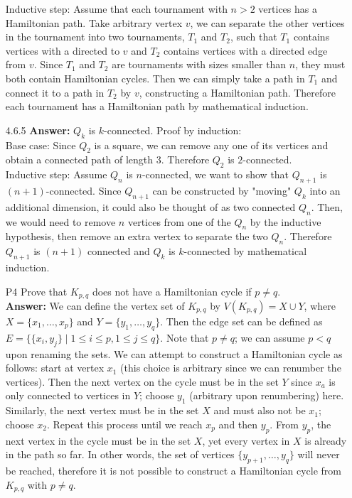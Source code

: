 \documentclass{article}
\begin{document}
\begin{itemize}
          Inductive step: Assume that each tournament with $n>2$ vertices has a Hamiltonian path. Take arbitrary vertex $v$, we can separate the other vertices in the tournament into two tournaments, $T_1$ and $T_2$, such that $T_1$ contains vertices with a directed to $v$ and $T_2$ contains vertices with a directed edge from $v$. Since $T_1$ and $T_2$ are tournaments with sizes smaller than $n$, they must both contain Hamiltonian cycles. Then we can simply take a path in $T_1$ and connect it to a path in $T_2$ by $v$, constructing a Hamiltonian path. Therefore each tournament has a Hamiltonian path by mathematical induction.
    \item [4.6.5] \textbf{Answer:} $Q_k$ is $k$-connected. Proof by induction:\\
          Base case: Since $Q_2$ is a square, we can remove any one of its vertices and obtain a connected path of length 3. Therefore $Q_2$ is $2$-connected.\\
          Inductive step: Assume $Q_n$ is $n$-connected, we want to show that $Q_{n+1}$ is $(n+1)$-connected. Since $Q_{n+1}$ can be constructed by "moving" $Q_k$ into an additional dimension, it could also be thought of as two connected $Q_n$. Then, we would need to remove $n$ vertices from one of the $Q_n$ by the inductive hypothesis, then remove an extra vertex to separate the two $Q_n$. Therefore $Q_{n+1}$ is $(n+1)$ connected and $Q_k$ is $k$-connected by mathematical induction.
    \item [P4] Prove that $K_{p,q}$ does not have a Hamiltonian cycle if $p\neq q$.\\
          \textbf{Answer:} We can define the vertex set of $K_{p,q}$ by $V(K_{p,q})=X\cup Y$, where $X=\{x_1,\ldots,x_p\}$ and $Y=\{y_1,\ldots,y_q\}$. Then the edge set can be defined as $E=\{\{x_i,y_j\}\mid 1\leq i\leq p, 1\leq j\leq q\}$. Note that $p\neq q$; we can assume $p<q$ upon renaming the sets. We can attempt to construct a Hamiltonian cycle as follows: start at  vertex $x_1$ (this choice is arbitrary since we can renumber the vertices). Then the next vertex on the cycle must be in the set $Y$ since $x_a$ is only connected to vertices in $Y$; choose $y_1$ (arbitrary upon renumbering) here. Similarly, the next vertex must be in the set $X$ and must also not be $x_1$; choose $x_2$. Repeat this process until we reach $x_p$ and then $y_p$. From $y_p$, the next vertex in the cycle must be in the set $X$, yet every vertex in $X$ is already in the path so far. In other words, the set of vertices $\{y_{p+1},\ldots,y_q\}$ will never be reached, therefore it is not possible to construct a Hamiltonian cycle from $K_{p,q}$ with $p\neq q$.

\end{itemize}
\end{document}
